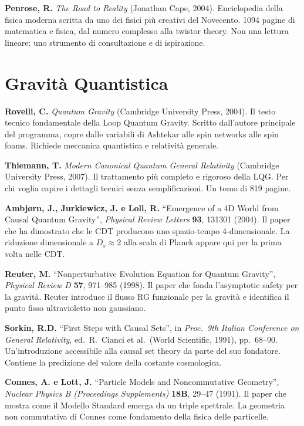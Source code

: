 \documentclass[11.5pt,a4paper,openany]{book}
\theoremstyle{remark}
\begin{document}
\textbf{Penrose, R.} \textit{The Road to Reality} (Jonathan Cape, 2004). Enciclopedia della fisica moderna scritta da uno dei fisici più creativi del Novecento. 1094 pagine di matematica e fisica, dal numero complesso alla twistor theory. Non una lettura lineare: uno strumento di consultazione e di ispirazione.

\section{Gravità Quantistica}

\textbf{Rovelli, C.} \textit{Quantum Gravity} (Cambridge University Press, 2004). Il testo tecnico fondamentale della Loop Quantum Gravity. Scritto dall'autore principale del programma, copre dalle variabili di Ashtekar alle spin networks alle spin foams. Richiede meccanica quantistica e relatività generale.

\textbf{Thiemann, T.} \textit{Modern Canonical Quantum General Relativity} (Cambridge University Press, 2007). Il trattamento più completo e rigoroso della LQG. Per chi voglia capire i dettagli tecnici senza semplificazioni. Un tomo di 819 pagine.

\textbf{Ambjørn, J., Jurkiewicz, J. e Loll, R.} ``Emergence of a 4D World from Causal Quantum Gravity'', \textit{Physical Review Letters} \textbf{93}, 131301 (2004). Il paper che ha dimostrato che le CDT producono uno spazio-tempo 4-dimensionale. La riduzione dimensionale a $D_s \approx 2$ alla scala di Planck appare qui per la prima volta nelle CDT.

\textbf{Reuter, M.} ``Nonperturbative Evolution Equation for Quantum Gravity'', \textit{Physical Review D} \textbf{57}, 971--985 (1998). Il paper che fonda l'asymptotic safety per la gravità. Reuter introduce il flusso RG funzionale per la gravità e identifica il punto fisso ultravioletto non gaussiano.

\textbf{Sorkin, R.D.} ``First Steps with Causal Sets'', in \textit{Proc.\ 9th Italian Conference on General Relativity}, ed.\ R.\ Cianci et al.\ (World Scientific, 1991), pp.\ 68--90. Un'introduzione accessibile alla causal set theory da parte del suo fondatore. Contiene la predizione del valore della costante cosmologica.

\textbf{Connes, A. e Lott, J.} ``Particle Models and Noncommutative Geometry'', \textit{Nuclear Physics B (Proceedings Supplements)} \textbf{18B}, 29--47 (1991). Il paper che mostra come il Modello Standard emerga da un triple spettrale. La geometria non commutativa di Connes come fondamento della fisica delle particelle.
\end{document}
